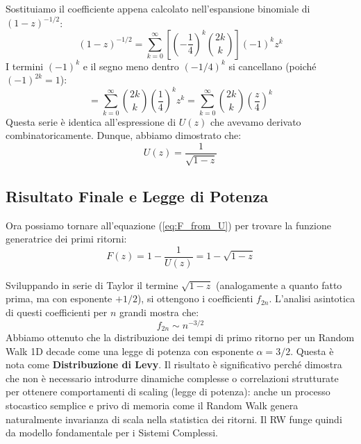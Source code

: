 \hfill

\noindent Sostituiamo il coefficiente appena calcolato nell'espansione binomiale di $(1-z)^{-1/2}$:
\begin{equation}
    (1-z)^{-1/2} = \sum_{k=0}^{\infty} \left[ \left(-\frac{1}{4}\right)^k \binom{2k}{k} \right] (-1)^k z^k
\end{equation}
I termini $(-1)^k$ e il segno meno dentro $(-1/4)^k$ si cancellano (poiché $(-1)^{2k} = 1$):
\begin{equation}
    = \sum_{k=0}^{\infty} \binom{2k}{k} \left(\frac{1}{4}\right)^k z^k = \sum_{k=0}^{\infty} \binom{2k}{k} \left(\frac{z}{4}\right)^k
\end{equation}
Questa serie è identica all'espressione di $U(z)$ che avevamo derivato combinatoricamente.
Dunque, abbiamo dimostrato che:
\begin{equation}
    U(z) = \frac{1}{\sqrt{1-z}}
\end{equation}

\subsection{Risultato Finale e Legge di Potenza}

Ora possiamo tornare all'equazione (\ref{eq:F_from_U}) per trovare la funzione generatrice dei primi ritorni:
\begin{equation}
    F(z) = 1 - \frac{1}{U(z)} = 1 - \sqrt{1-z}
\end{equation}

Sviluppando in serie di Taylor il termine $\sqrt{1-z}$ (analogamente a quanto fatto prima, ma con esponente $+1/2$), si ottengono i coefficienti $f_{2n}$.
L'analisi asintotica di questi coefficienti per $n$ grandi mostra che:
\begin{equation}
    f_{2n} \sim n^{-3/2}
\end{equation}
Abbiamo ottenuto che la distribuzione dei tempi di primo ritorno per un Random Walk 1D decade come una legge di potenza con esponente $\alpha = 3/2$.
Questa è nota come \textbf{Distribuzione di Levy}.
Il risultato è significativo perché dimostra che non è necessario introdurre dinamiche complesse o correlazioni strutturate per ottenere comportamenti di scaling (legge di potenza): anche un processo stocastico semplice e privo di memoria come il Random Walk genera naturalmente invarianza di scala nella statistica dei ritorni. Il RW funge quindi da modello fondamentale per i Sistemi Complessi.

